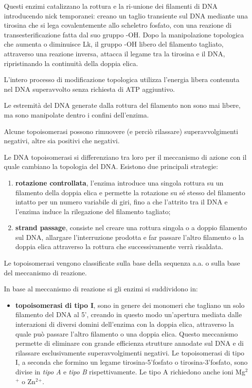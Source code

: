 \documentclass[11pt]{book}
\begin{document}
Questi enzimi catalizzano la rottura e la ri-unione dei filamenti di DNA
introducendo nick temporanei: creano un taglio transiente sul DNA
mediante una tirosina che si lega covalentemente allo scheletro fosfato,
con una reazione di transesterificazione fatta dal suo gruppo -OH. Dopo
la manipolazione topologica che aumenta o diminuisce Lk, il gruppo -OH
libero del filamento tagliato, attraverso una reazione inversa, attacca
il legame tra la tirosina e il DNA, ripristinando la continuità della
doppia elica.

L'intero processo di modificazione topologica utilizza l'energia libera
contenuta nel DNA superavvolto senza richiesta di ATP aggiuntivo.

Le estremità del DNA generate dalla rottura del filamento non sono mai
libere, ma sono manipolate dentro i confini dell'enzima.

Alcune topoisomerasi possono rimuovere (e perciò rilassare)
superavvolgimenti negativi, altre sia positivi che negativi.

Le DNA topoisomerasi si differenziano tra loro per il meccanismo di
azione con il quale cambiano la topologia del DNA. Esistono due
principali strategie:

\begin{enumerate}
\def\labelenumi{\arabic{enumi}.}
\itemsep1pt\parskip0pt
\item
  \textbf{rotazione controllata}, l'enzima introduce una singola rottura
  su un filamento della doppia elica e permette la rotazione su sé
  stesso del filamento intatto per un numero variabile di giri, fino a
  che l'attrito tra il DNA e l'enzima induce la rilegazione del
  filamento tagliato;
\item
  \textbf{strand passage}, consiste nel creare una rottura singola o a
  doppio filamento sul DNA, allargare l'interruzione prodotta e far
  passare l'altro filamento o la doppia elica attraverso la rottura che
  successivamente verrà risaldata.
\end{enumerate}

Le topoisomerasi vengono classificate sulla base della sequenza a.a.
o sulla base del meccanismo di reazione.

In base al meccanismo di reazione si gli enzimi si suddividono in:

\begin{itemize}
\itemsep1pt\parskip0pt
\item
  \textbf{topoisomerasi di tipo I}, sono in genere dei monomeri che
  tagliano un solo filamento del DNA al 5', creando in questo modo
  un'apertura mediata dalle interazioni di diversi domini dell'enzima
  con la doppia elica, attraverso la quale può passare l'altro filamento
  o una doppia elica. Questo meccanismo permette di eliminare con grande
  efficienza strutture annodate sul DNA e di rilassare esclusivamente
  superavvolgimenti negativi. Le topoisomerasi di tipo I, a seconda che
  formino un legame tirosina-5'fosfato o tirosina-3'fosfato, sono divise
  in \emph{tipo A} e \emph{tipo B} rispettivamente. Le tipo A richiedono
  anche ioni Mg\(^2\)\(^+\) o Zn\(^2\)\(^+\).
\end{itemize}
\end{document}
